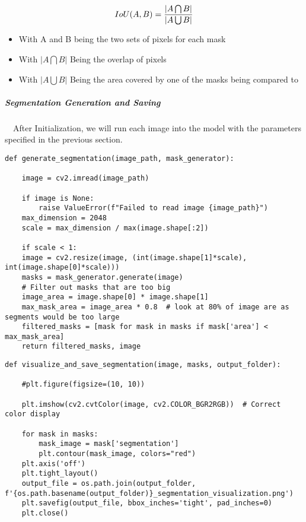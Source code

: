 \documentclass{article}
\begin{document}
$$\large IoU (A,B) = \frac{|A \bigcap B|}{|A \bigcup B|}$$
\begin{itemize}
\item With A and B being the two sets of pixels for each mask
\item With $|A \bigcap B|$ Being the overlap of pixels
\item With $|A \bigcup B|$ Being the area covered by one of the masks being compared to
\end{itemize}




\subparagraph*{Segmentation Generation and Saving}
$\quad$After Initialization, we will run each image into the model with the parameters specified in the previous section. 

\begingroup\footnotesize
\begin{verbatim}
def generate_segmentation(image_path, mask_generator):

    image = cv2.imread(image_path)

    if image is None:
        raise ValueError(f"Failed to read image {image_path}")
    max_dimension = 2048
    scale = max_dimension / max(image.shape[:2])

    if scale < 1:
    image = cv2.resize(image, (int(image.shape[1]*scale), int(image.shape[0]*scale)))
    masks = mask_generator.generate(image)
    # Filter out masks that are too big
    image_area = image.shape[0] * image.shape[1]
    max_mask_area = image_area * 0.8  # look at 80% of image are as segments would be too large
    filtered_masks = [mask for mask in masks if mask['area'] < max_mask_area]
    return filtered_masks, image
\end{verbatim}
\endgroup

\begingroup\footnotesize
\begin{verbatim}
def visualize_and_save_segmentation(image, masks, output_folder):

    #plt.figure(figsize=(10, 10))

    plt.imshow(cv2.cvtColor(image, cv2.COLOR_BGR2RGB))  # Correct color display

    for mask in masks:
        mask_image = mask['segmentation']
        plt.contour(mask_image, colors="red")
    plt.axis('off')
    plt.tight_layout()
    output_file = os.path.join(output_folder,                f'{os.path.basename(output_folder)}_segmentation_visualization.png')
    plt.savefig(output_file, bbox_inches='tight', pad_inches=0)
    plt.close()
\end{verbatim}
\endgroup
\end{document}
